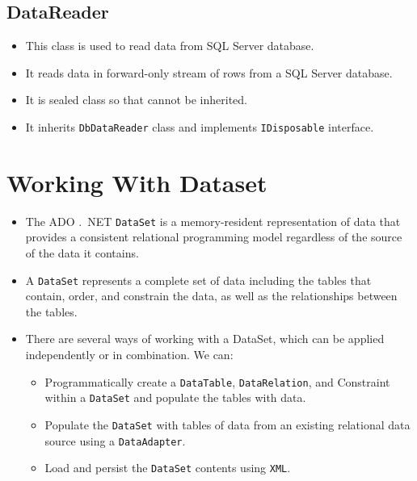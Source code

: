 \subsection{DataReader}\label{sec:data-reader}
\begin{itemize}
	\item This class is used to read data from SQL Server database. 
	\item It reads data in forward-only stream of rows from a SQL Server database. 
	\item It is sealed class so that cannot be inherited. 
	\item It inherits \texttt{DbDataReader} class and implements \texttt{IDisposable} interface.
\end{itemize}






\section{Working With Dataset}
\begin{itemize}
	\item The ADO .\ NET \texttt{DataSet} is a memory-resident representation of data that provides a consistent relational
	programming model regardless of the source of the data it contains. 
	\item A \texttt{DataSet} represents a complete set of data including the tables that contain, order, and constrain the data, as well as the relationships
	between the tables.
	\item There are several ways of working with a DataSet, which can be applied independently or in combination.
	 We can:
	 \begin{itemize}
	 	\item Programmatically create a \texttt{DataTable}, \texttt{DataRelation}, and Constraint within a \texttt{DataSet} and populate the tables with data.
	 	\item Populate the \texttt{DataSet} with tables of data from an existing relational data source using a \texttt{DataAdapter}.
	 	\item Load and persist the \texttt{DataSet} contents using \texttt{XML}.
	 \end{itemize}
\end{itemize}



